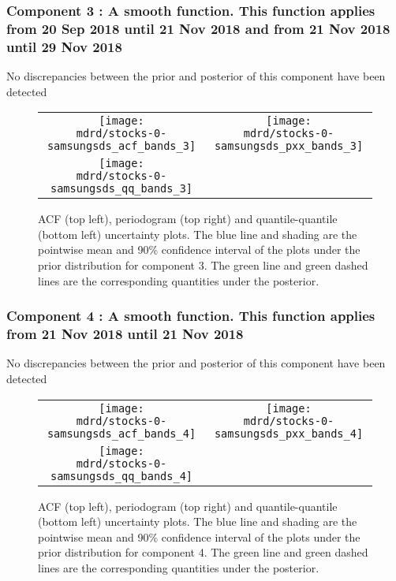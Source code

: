 \documentclass{article} %
\begin{document}
\subsubsection{Component 3 : A smooth function. This function applies from 20 Sep 2018 until 21 Nov 2018 and from 21 Nov 2018 until 29 Nov 2018}

No discrepancies between the prior and posterior of this component have been detected

\begin{figure}[H]
\newcommand{\wmgd}{0.5\columnwidth}
\newcommand{\hmgd}{3.0cm}
\newcommand{\mdrd}{stocks-0-samsungsds}
\newcommand{\mbm}{\hspace{-0.3cm}}
\begin{tabular}{cc}
\mbm \texttt{[image: \\mdrd/stocks-0-samsungsds\_acf\_bands\_3]} & \texttt{[image: \\mdrd/stocks-0-samsungsds\_pxx\_bands\_3]} \\
\mbm \texttt{[image: \\mdrd/stocks-0-samsungsds\_qq\_bands\_3]}
\end{tabular}
\caption{
ACF (top left), periodogram (top right) and quantile-quantile (bottom left) uncertainty plots.
The blue line and shading are the pointwise mean and 90\% confidence interval of the plots under the prior distribution for component 3.
The green line and green dashed lines are the corresponding quantities under the posterior.}
\label{fig:check3}
\end{figure}

\subsubsection{Component 4 : A smooth function. This function applies from 21 Nov 2018 until 21 Nov 2018}

No discrepancies between the prior and posterior of this component have been detected

\begin{figure}[H]
\newcommand{\wmgd}{0.5\columnwidth}
\newcommand{\hmgd}{3.0cm}
\newcommand{\mdrd}{stocks-0-samsungsds}
\newcommand{\mbm}{\hspace{-0.3cm}}
\begin{tabular}{cc}
\mbm \texttt{[image: \\mdrd/stocks-0-samsungsds\_acf\_bands\_4]} & \texttt{[image: \\mdrd/stocks-0-samsungsds\_pxx\_bands\_4]} \\
\mbm \texttt{[image: \\mdrd/stocks-0-samsungsds\_qq\_bands\_4]}
\end{tabular}
\caption{
ACF (top left), periodogram (top right) and quantile-quantile (bottom left) uncertainty plots.
The blue line and shading are the pointwise mean and 90\% confidence interval of the plots under the prior distribution for component 4.
The green line and green dashed lines are the corresponding quantities under the posterior.}
\label{fig:check4}
\end{figure}
\end{document}

